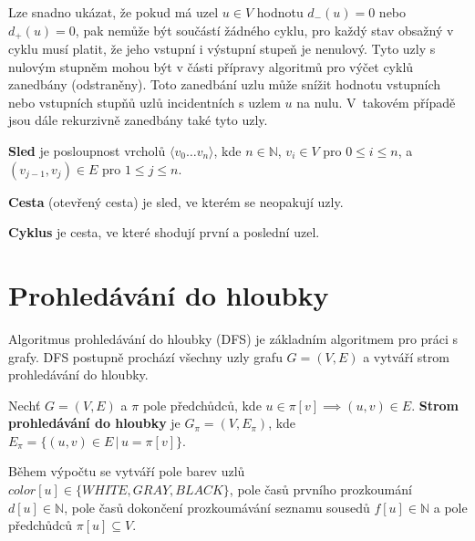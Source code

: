         Lze snadno ukázat, že pokud má uzel $u \in V$ hodnotu $d_-(u) = 0$ nebo $d_+(u) = 0$, pak nemůže být součástí žádného cyklu, pro každý stav obsažný v cyklu musí platit, že jeho vstupní i výstupní stupeň je nenulový. Tyto uzly s nulovým stupněm mohou být v části přípravy algoritmů pro výčet cyklů zanedbány (odstraněny). Toto zanedbání uzlu může snížit hodnotu vstupních nebo vstupních stupňů uzlů incidentních s uzlem $u$ na nulu. V~takovém případě jsou dále rekurzivně zanedbány také tyto uzly.

        \begin{definition}
            \textbf{Sled} je posloupnost vrcholů $\langle v_0 \dots v_n\rangle$, kde $n \in \mathbb{N}$, $v_i \in V$ pro $0 \leq i \leq n$, a $(v_{j-1}, v_j) \in E$ pro $1 \leq j \leq n$.
        \end{definition}

        \begin{definition}
            \textbf{Cesta} (otevřený cesta) je sled, ve kterém se neopakují uzly.
        \end{definition}

        \begin{definition}
            \textbf{Cyklus} je cesta, ve které shodují první a poslední uzel.
        \end{definition}

    \section{Prohledávání do hloubky}
        Algoritmus prohledávání do hloubky (DFS) je základním algoritmem pro práci s grafy. DFS postupně prochází všechny uzly grafu $G = (V, E)$ a vytváří strom prohledávání do hloubky.

        \begin{definition}
            Nechť $G = (V, E)$ a $\pi$ pole předchůdců, kde $u \in \pi[v] \implies (u, v) \in E$. \textbf{Strom prohledávání do hloubky} je $G_\pi = (V, E_\pi)$, kde $E_\pi = \{(u, v) \in E\,|\, u = \pi[v]\}$.\\
        \end{definition}

        Během výpočtu se vytváří pole barev uzlů $color[u] \in \{WHITE, GRAY, BLACK\}$, pole časů prvního prozkoumání $d[u] \in \mathbb{N}$, pole časů dokončení prozkoumávání seznamu sousedů $f[u] \in \mathbb{N}$ a pole předchůdců $\pi[u] \subseteq V$.

